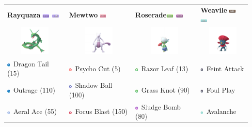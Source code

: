 \documentclass[8pt,aspectratio=169,compress]{beamer}
\newcommand{\darkfull}{\includegraphics[height=0.15cm]{../../images/type/full/Dark.png}}
\newcommand{\flyingfull}{\includegraphics[height=0.15cm]{../../images/type/full/Flying.png}}
\newcommand{\dragonfull}{\includegraphics[height=0.15cm]{../../images/type/full/Dragon.png}}
\newcommand{\grassfull}{\includegraphics[height=0.15cm]{../../images/type/full/Grass.png}}
\newcommand{\icefull}{\includegraphics[height=0.15cm]{../../images/type/full/Ice.png}}
\newcommand{\psychicfull}{\includegraphics[height=0.15cm]{../../images/type/full/Psychic.png}}
\newcommand{\poisonfull}{\includegraphics[height=0.15cm]{../../images/type/full/Poison.png}}
\newcommand{\fightingsimp}{\includegraphics[height=0.15cm]{../../images/type/simplified/fighting.png}}
\newcommand{\dragonsimp}{\includegraphics[height=0.15cm]{../../images/type/simplified/dragon.png}}
\newcommand{\darksimp}{\includegraphics[height=0.15cm]{../../images/type/simplified/dark.png}}
\newcommand{\ghostsimp}{\includegraphics[height=0.15cm]{../../images/type/simplified/ghost.png}}
\newcommand{\psysimp}{\includegraphics[height=0.15cm]{../../images/type/simplified/psy.png}}
\newcommand{\icesimp}{\includegraphics[height=0.15cm]{../../images/type/simplified/ice.png}}
\newcommand{\grasssimp}{\includegraphics[height=0.15cm]{../../images/type/simplified/grass.png}}
\newcommand{\flyingsimp}{\includegraphics[height=0.15cm]{../../images/type/simplified/flying.png}}
\newcommand{\poisonsimp}{\includegraphics[height=0.15cm]{../../images/type/simplified/poison.png}}
\begin{document}
\begin{frame}
\begin{block}{}
\begin{tiny}
\begin{itemize}
\begin{center}
\begin{tabular}{p{1.9cm}p{1.9cm}p{1.9cm}p{1.9cm}}
\textbf{Rayquaza} \hfill \dragonfull~\flyingfull & \textbf{Mewtwo} \hfill \psychicfull & \textbf{Roserade}\hfill \grassfull~\poisonfull  & \textbf{Weavile} \hfill \darkfull~\icefull  \\ 
\multicolumn{1}{c}{\includegraphics[width=1.5cm]{../../images/pokemon/Rayquaza}} & \multicolumn{1}{c}{\includegraphics[width=1.5cm]{../../images/pokemon/Mewtwo}} & \multicolumn{1}{c}{\includegraphics[width=1.5cm]{../../images/pokemon/Roserade}} & \multicolumn{1}{c}{\includegraphics[width=1.5cm]{../../images/pokemon/Weavile}} \\   \hline
\dragonsimp~Dragon Tail (15) & \psysimp~Psycho Cut (5) & \grasssimp~Razor Leaf (13) & \darksimp~Feint Attack \\
\dragonsimp~Outrage (110) & \ghostsimp~Shadow Ball (100) &  \grasssimp~Grass Knot (90) & \darksimp~Foul Play \\
\flyingsimp~Aeral Ace (55) & \fightingsimp~Focus Blast (150) &  \poisonsimp~Sludge Bomb (80) & \icesimp~Avalanche \\ 
\end{tabular}
\end{center}

\end{itemize}


\end{tiny}
\end{block}
\end{frame}
\end{document}
